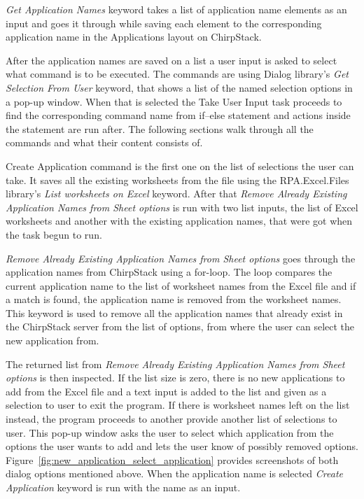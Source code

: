 \textit{Get Application Names} keyword takes a list of application name elements as an input and goes it through while saving each element to the corresponding application name in the Applications layout on ChirpStack.

After the application names are saved on a list a user input is asked to select what command is to be executed.
The commands are using Dialog library's\cite{robotFramework:dialogsLibrary} \textit{Get Selection From User} keyword, that shows a list of the named selection options in a pop-up window.
When that is selected the Take User Input task proceeds to find the corresponding command name from if--else statement and actions inside the statement are run after.
The following sections walk through all the commands and what their content consists of.


Create Application command is the first one on the list of selections the user can take.
It saves all the existing worksheets from the  file using the RPA.Excel.Files library's\cite{rpaFramework:excelFiles} \textit{List worksheets on Excel} keyword.
After that \textit{Remove Already Existing Application Names from Sheet options} is run with two list inputs, the list of Excel worksheets and another with the existing application names, that were got when the task begun to run.

\textit{Remove Already Existing Application Names from Sheet options} goes through the application names from ChirpStack using a for-loop. The loop compares the current application name to the list of worksheet names from the Excel file and if a match is found, the application name is removed from the worksheet names.
This keyword is used to remove all the application names that already exist in the ChirpStack server from the list of options, from where the user can select the new application from.

The returned list from \textit{Remove Already Existing Application Names from Sheet options} is then inspected.
If the list size is zero, there is no new applications to add from the Excel file and a text input is added to the list and given as a selection to user to exit the program.
If there is worksheet names left on the list instead, the program proceeds to another provide another list of selections to user.
This pop-up window asks the user to select which application from the options the user wants to add and lets the user know of possibly removed options.
Figure~\ref{fig:new_application_select_application} provides screenshots of both dialog options mentioned above.
When the application name is selected \textit{Create Application} keyword is run with the name as an input.

